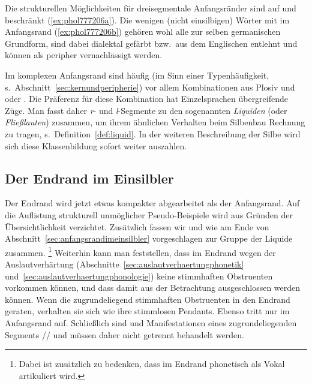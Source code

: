 Die strukturellen Möglichkeiten für dreisegmentale Anfangsränder sind auf \textipa{[SpK]} und \textipa{[StK]} beschränkt (\ref{ex:phol777206a}).
Die wenigen (nicht einsilbigen) Wörter mit \textipa{[Spl]} im Anfangsrand (\ref{ex:phol777206b}) gehören wohl alle zur selben germanischen Grundform, sind dabei dialektal gefärbt bzw.\ aus dem Englischen entlehnt und können als peripher vernachlässigt werden.

\begin{exe}
	\ex\label{ex:phol777206}
	\begin{xlist}
	\end{xlist}
\end{exe}

Im komplexen Anfangsrand sind häufig (im Sinn einer Typenhäufigkeit, s.\ Abschnitt~\ref{sec:kernundperipherie}) vor allem Kombinationen aus Plosiv und \textipa{[K]} oder \textipa{[l]}.
Die Präferenz für diese Kombination hat Einzelsprachen übergreifende Züge.
Man fasst daher \textit{r}- und \textit{l}-Segmente zu den sogenannten \textit{Liquiden} (oder \textit{Fließlauten}) zusammen, um ihrem ähnlichen Verhalten beim Silbenbau Rechnung zu tragen, s.\ Definition~\ref{def:liquid}.
In der weiteren Beschreibung der Silbe wird sich diese Klassenbildung sofort weiter auszahlen.


\subsection{Der Endrand im Einsilbler}

\label{sec:endrandimeinsilbler}

Der Endrand wird jetzt etwas kompakter abgearbeitet als der Anfangsrand.
Auf die Auflistung strukturell unmöglicher Pseudo-Beispiele wird aus Gründen der Übersichtlichkeit verzichtet.
Zusätzlich fassen wir \textipa{[l]} und \textipa{[K]} wie am Ende von Abschnitt~\ref{sec:anfangsrandimeinsilbler} vorgeschlagen zur Gruppe der Liquide zusammen.%
\footnote{Dabei ist zusätzlich zu bedenken, dass \textipa{[K]} im Endrand phonetisch als Vokal artikuliert wird.}
Weiterhin kann man feststellen, dass im Endrand wegen der Auslautverhärtung (Abschnitte~\ref{sec:auslautverhaertungphonetik} und~\ref{sec:auslautverhaertungphonologie}) keine stimmhaften Obstruenten vorkommen können, und dass damit \textipa{[b d g v z J]} aus der Betrachtung ausgeschlossen werden können.
Wenn die zugrundeliegend stimmhaften Obstruenten in den Endrand geraten, verhalten sie sich wie ihre stimmlosen Pendants. 
Ebenso tritt \textipa{[h]} nur im Anfangsrand auf.
Schließlich sind \textipa{[\c{c}]} und \textipa{[X]} Manifestationen eines zugrundeliegenden Segments // und müssen daher nicht getrennt behandelt werden.

